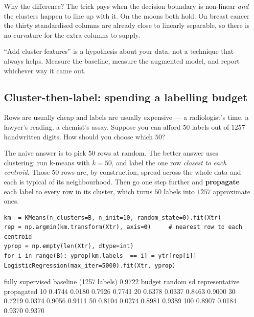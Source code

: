 \documentclass[11pt]{article}
\begin{document}
Why the difference? The trick pays when the decision boundary is non-linear
\emph{and} the clusters happen to line up with it. On the moons both hold. On
breast cancer the thirty standardised columns are already close to linearly
separable, so there is no curvature for the extra columns to supply.

\begin{keyidea}
``Add cluster features'' is a hypothesis about your data, not a technique that
always helps. Measure the baseline, measure the augmented model, and report
whichever way it came out.
\end{keyidea}

\subsection{Cluster-then-label: spending a labelling budget}
\label{sec:budget}

Rows are usually cheap and labels are usually expensive --- a radiologist's
time, a lawyer's reading, a chemist's assay. Suppose you can afford $50$
labels out of $1257$ handwritten digits. How should you choose which $50$?

The naive answer is to pick $50$ rows at random. The better answer uses
clustering: run k-means with $k = 50$, and label the one row \emph{closest to
each centroid}. Those $50$ rows are, by construction, spread across the whole
data and each is typical of its neighbourhood. Then go one step further and
\textbf{propagate} each label to every row in its cluster, which turns $50$
labels into $1257$ approximate ones.

\begin{lstlisting}
km  = KMeans(n_clusters=B, n_init=10, random_state=0).fit(Xtr)
rep = np.argmin(km.transform(Xtr), axis=0)     # nearest row to each centroid
yprop = np.empty(len(Xtr), dtype=int)
for i in range(B): yprop[km.labels_ == i] = ytr[rep[i]]
LogisticRegression(max_iter=5000).fit(Xtr, yprop)
\end{lstlisting}
\begin{codeout}
fully supervised baseline (1257 labels) 0.9722
 budget     random       sd   representative    propagated
     10     0.4744   0.0180           0.7926        0.7741
     20     0.6378   0.0337           0.8463        0.9000
     30     0.7219   0.0374           0.9056        0.9111
     50     0.8104   0.0274           0.8981        0.9389
    100     0.8907   0.0184           0.9370        0.9370
\end{codeout}
\end{document}
